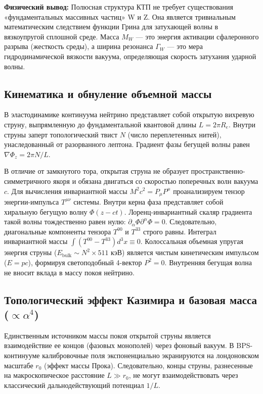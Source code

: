 \documentclass[11pt,a4paper]{article}
\begin{document}
\textbf{Физический вывод:} Полюсная структура КТП не требует существования «фундаментальных массивных частиц» W и Z. Она является тривиальным математическим следствием функции Грина для затухающей волны в вязкоупругой сплошной среде. Масса $M_W$ — это энергия активации сфалеронного разрыва (жесткость среды), а ширина резонанса $\Gamma_W$ — это мера гидродинамической вязкости вакуума, определяющая скорость затухания ударной волны. 

\subsection{Кинематика и обнуление объемной массы}
В эластодинамике континуума нейтрино представляет собой открытую вихревую струну, выпрямленную до фундаментальной квантовой длины $L = 2\pi R_e$. Внутри струны заперт топологический твист $N$ (число переплетенных нитей), унаследованный от разорванного лептона. Градиент фазы бегущей волны равен $\nabla \Phi_z = 2\pi N / L$.

В отличие от замкнутого тора, открытая струна не образует пространственно-симметричного якоря и обязана двигаться со скоростью поперечных волн вакуума $c$. Для вычисления инвариантной массы $M^2 c^2 = P_\mu P^\mu$ проанализируем тензор энергии-импульса $T^{\mu\nu}$ системы.
Внутри керна фаза представляет собой хиральную бегущую волну $\Phi(z-ct)$. Лоренц-инвариантный скаляр градиента такой волны тождественно равен нулю: $\partial_\alpha \Phi \partial^\alpha \Phi = 0$. 
Следовательно, диагональные компоненты тензора $T^{00}$ и $T^{33}$ строго равны. Интеграл инвариантной массы $\int (T^{00} - T^{33}) d^3x \equiv 0$. Колоссальная объемная упругая энергия струны ($E_{\text{bulk}} \sim N^2 \times 511$ кэВ) является чистым кинетическим импульсом ($E = pc$), формируя светоподобный 4-вектор $P^2 = 0$. Внутренняя бегущая волна не вносит вклада в массу покоя нейтрино.

\subsection{Топологический эффект Казимира и базовая масса ($\propto \alpha^4$)}
Единственным источником массы покоя открытой струны является взаимодействие ее концов (фазовых монополей) через фоновый вакуум. 
В BPS-континууме калибровочные поля экспоненциально экранируются на лондоновском масштабе $r_0$ (эффект массы Прока). Следовательно, концы струны, разнесенные на макроскопическое расстояние $L \gg r_0$, не могут взаимодействовать через классический дальнодействующий потенциал $1/L$. 
\end{document}
